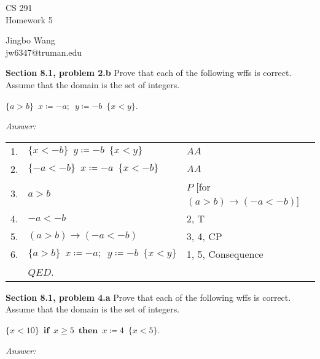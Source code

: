 \documentclass[12pt]{article}
\begin{document}
\begin{center}
{\large CS 291}\\
Homework 5
\end{center}

\begin{flushright}
Jingbo Wang\\
jw6347@truman.edu \\
\end{flushright}


\textbf{Section 8.1, problem 2.b}  Prove that each of the following wffs is correct. 
Assume that the domain is the set of integers.

$ \{ a > b \} \enspace x \coloneqq -a; \enspace y \coloneqq -b  \enspace \{ x < y \}$.

\emph{Answer:} 

\begin{tabular}{p{.8cm}p{8.5cm}l}
1. & $\{ x < -b \} \enspace y \coloneqq -b \enspace \{ x < y \}$   & $AA$ \\
2. & $\{ -a < -b \} \enspace x \coloneqq -a \enspace \{ x < -b \}$  & $AA$ \\
3. & \qquad $a > b$ & $P$ [for $(a > b) \rightarrow ( -a < -b)$] \\
4. & \qquad $-a < -b$ & 2, T\\
5. & $(a > b) \rightarrow (-a < -b)$ & 3, 4, CP \\
6. & $\{ a > b \} \enspace x \coloneqq - a; \enspace y \coloneqq - b\enspace\{ x < y \}$ 
                                     & 1, 5, Consequence \\
& $QED$. \\
\end{tabular}

\textbf{Section 8.1, problem 4.a}  Prove that each of the following wffs is correct. 
Assume that the domain is the set of integers.

$ \{ x < 10 \} \enspace \textbf{if} \enspace x \geq 5 \enspace \textbf{then} \enspace x 
\coloneqq 4 \enspace \{ x < 5 \}$.

\emph{Answer:} 
\end{document}
